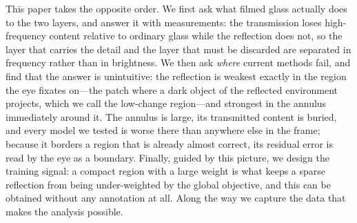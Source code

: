 This paper takes the opposite order. We first ask what filmed glass actually does to the two layers,
and answer it with measurements: the transmission loses high-frequency content relative to ordinary
glass while the reflection does not, so the layer that carries the detail and the layer that must be
discarded are separated in frequency rather than in brightness. We then ask \emph{where} current
methods fail, and find that the answer is unintuitive: the reflection is weakest exactly in the
region the eye fixates on---the patch where a dark object of the reflected environment projects,
which we call the low-change region---and strongest in the annulus immediately around it. The
annulus is large, its transmitted content is buried, and every model we tested is worse there than
anywhere else in the frame; because it borders a region that is already almost correct, its residual
error is read by the eye as a boundary. Finally, guided by this picture, we design the training
signal: a compact region with a large weight is what keeps a sparse reflection from being
under-weighted by the global objective, and this can be obtained without any annotation at all.
Along the way we capture the data that makes the analysis possible.

